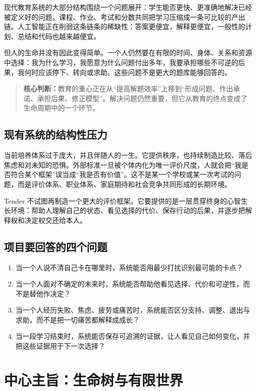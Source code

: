 \documentclass[UTF8,a4paper,11pt]{ctexart}
\newcommand{\keypoint}[1]{\begin{quote}\noindent\textbf{\color{TenderBlue}核心判断：}#1\end{quote}}
\begin{document}
现代教育系统的大部分结构围绕一个问题展开：学生能否更快、更准确地解决已经被定义好的问题。课程、作业、考试和分数共同把学习压缩成一条可比较的产出链。人工智能正在削弱这条链条的稀缺性：答案更便宜，解释更便宜，一般性的计划、总结和代码也越来越便宜。

但人的生命并没有因此变得简单。一个人仍然要在有限的时间、身体、关系和资源中选择：我为什么学习，我愿意为什么问题付出多年，我要承担哪些不可逆的后果，我何时应该停下、转向或求助。这些问题不是更大的题库能够回答的。

\keypoint{教育的重心正在从“提高解题效率”上移到“形成问题、作出承诺、承担后果、修正模型”。解决问题仍然重要，但它从教育的终点变成了生命周期中的一个环节。}

\subsection{现有系统的结构性压力}

当前培养体系过于庞大，并且伴随人的一生。它提供秩序，也持续制造比较、落后焦虑和对未知的恐惧。外部标准一旦被个体内化为唯一评价尺度，人就会把“我是否符合某个框架”误当成“我是否有价值”。这不是某一个学校或某一次考试的问题，而是评价体系、职业体系、家庭期待和社会竞争共同形成的长期环境。

Tender 不试图再制造一个更大的评价框架。它要提供的是一层贯穿终身的心智生长环境：帮助人理解自己的状态、看见选择的代价、保存行动的后果，并逐步把解释权和决定权交还给本人。

\subsection{项目要回答的四个问题}

\begin{enumerate}
\item 当一个人说不清自己卡在哪里时，系统能否用最少打扰识别最可能的卡点？
\item 当一个人面对不确定的未来时，系统能否帮助他看见选择、代价和可逆性，而不是替他作决定？
\item 当一个人经历失败、焦虑、疲劳或痛苦时，系统能否区分支持、调整、退出与求助，而不是把一切痛苦都解释成成长？
\item 当一段学习结束时，系统能否保存可追溯的证据，让人看见自己如何变化，并把这些证据用于下一次选择？
\end{enumerate}

\newpage
\section{中心主旨：生命树与有限世界}
\end{document}
